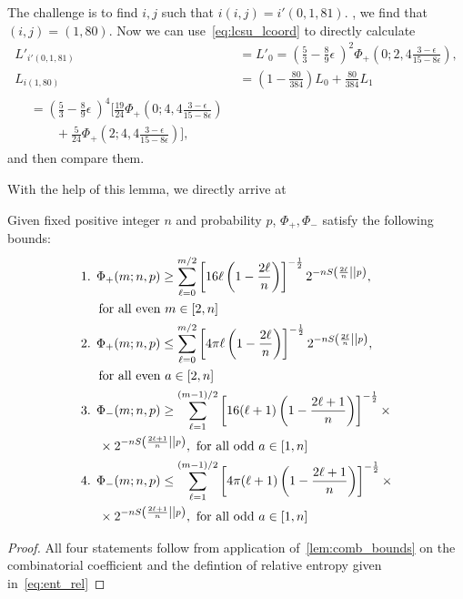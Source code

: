 \documentclass[pra,
aps,
twocolumn,
superscriptaddress,
groupedaddress,
nofootinbib,
reprint
]{revtex4-1}
\begin{document}
The challenge is to find $i,j$ such that $i(i,j) = i'(0,1,81)$.
, we find that $(i,j) = (1, 80)$.
Now we can use~\cref{eq:lcsu_lcoord} to directly calculate
\begin{align*}
	L'_{i'(0,1,81)} &= L'_0 = \left( \frac{5}{3} - \frac{8}{9}\epsilon\ \right)^2 \Phi_+\left(0;2,4\frac{3-\epsilon}{15-8\epsilon}\right), \\
	L_{i(1, 80)} &= \left(1-\frac{80}{384} \right) L_0 + \frac{80}{384} L_1 \\
	\begin{split}
	&= \left( \frac{5}{3} - \frac{8}{9}\epsilon\ \right)^4 \bigg[ \frac{19}{24} \Phi_+\left(0;4,4\frac{3-\epsilon}{15-8\epsilon}\right) \\ 
	&\qquad + \frac{5}{24}\Phi_+\left(2;4,4\frac{3-\epsilon}{15-8\epsilon}\right) \bigg],
	\end{split}
\end{align*}
and then compare them.

With the help of this lemma, we directly arrive at 
\begin{theorem}\label{thm:bounds_strict}
	Given fixed positive integer $n$ and probability $p$, $\Phi_+, \Phi_-$ satisfy the following bounds:
	\begin{align*}
		\begin{split}
		&\text{1. } \Phi_+(m; n, p) \geq \sum\limits_{\ell=0}^{m/2}\left[ 16\ell\left(1-\frac{2\ell}{n}\right) \right]^{-\frac{1}{2}} 2^{-n\ent{\frac{2\ell}{n}}{p}}, \\
		&\hspace{14pt} \text{for all even } m\in [2,n] \\
		&\text{2. } \Phi_+(m; n, p) \leq \sum\limits_{\ell=0}^{m/2}\left[ 4\pi\ell\left(1-\frac{2\ell}{n}\right) \right]^{-\frac{1}{2}} 2^{-n\ent{\frac{2\ell}{n}}{p}}, \\
		&\hspace{14pt} \text{for all even } a\in [2,n] \\
		&\text{3. } \Phi_-(m; n, p) \geq \sum\limits_{\ell=1}^{(m-1)/2}\left[ 16(\ell+1)\left(1-\frac{2\ell+1}{n}\right) \right]^{-\frac{1}{2}} \times \\
		&\hspace{14pt} \times 2^{-n\ent{\frac{2\ell+1}{n}}{p}},\ \text{for all odd }a\in [1,n] \\
		&\text{4. } \Phi_-(m; n, p) \leq \sum\limits_{\ell=1}^{(m-1)/2}\left[ 4\pi(\ell+1)\left(1-\frac{2\ell+1}{n}\right) \right]^{-\frac{1}{2}} \times \\
		&\hspace{14pt} \times 2^{-n\ent{\frac{2\ell+1}{n}}{p}},\ \text{for all odd } a\in [1,n]
		\end{split}
	\end{align*}
\end{theorem}
\begin{proof}
	All four statements follow from application of~\cref{lem:comb_bounds} on the combinatorial coefficient and the defintion of relative entropy given in~\cref{eq:ent_rel}
\end{proof}
\end{document}
